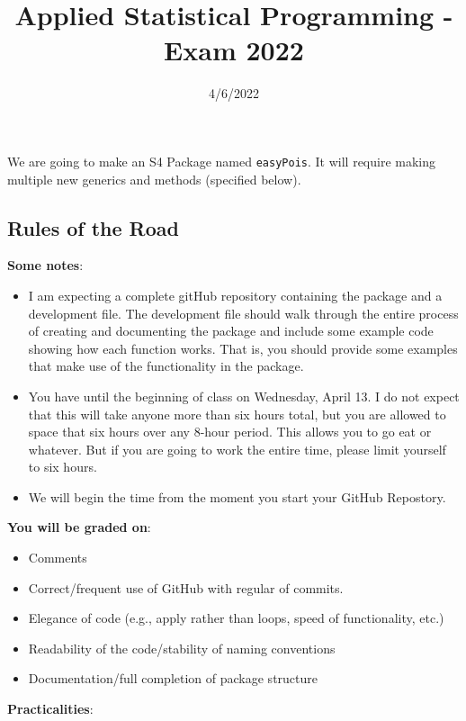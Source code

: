 \documentclass[
]{article}
\title{Applied Statistical Programming - Exam 2022}
\author{}
\date{\vspace{-2.5em}4/6/2022}
\providecommand{\tightlist}{%
  \setlength{\itemsep}{0pt}\setlength{\parskip}{0pt}}
\begin{document}
\maketitle

We are going to make an S4 Package named \texttt{easyPois}. It will
require making multiple new generics and methods (specified below).

\hypertarget{rules-of-the-road}{%
\subsection{Rules of the Road}\label{rules-of-the-road}}

\textbf{Some notes}:

\begin{itemize}
\tightlist
\item
  I am expecting a complete gitHub repository containing the package and
  a development file. The development file should walk through the
  entire process of creating and documenting the package and include
  some example code showing how each function works. That is, you should
  provide some examples that make use of the functionality in the
  package.
\item
  You have until the beginning of class on Wednesday, April 13. I do not
  expect that this will take anyone more than six hours total, but you
  are allowed to space that six hours over any 8-hour period. This
  allows you to go eat or whatever. But if you are going to work the
  entire time, please limit yourself to six hours.
\item
  We will begin the time from the moment you start your GitHub
  Repostory.
\end{itemize}

\textbf{You will be graded on}:

\begin{itemize}
\tightlist
\item
  Comments
\item
  Correct/frequent use of GitHub with regular of commits.
\item
  Elegance of code (e.g., apply rather than loops, speed of
  functionality, etc.)
\item
  Readability of the code/stability of naming conventions
\item
  Documentation/full completion of package structure
\end{itemize}

\textbf{Practicalities}:
\end{document}
